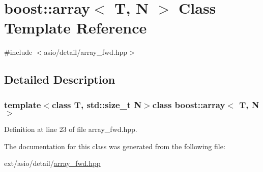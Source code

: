 \hypertarget{classboost_1_1array}{}\section{boost\+:\+:array$<$ T, N $>$ Class Template Reference}
\label{classboost_1_1array}


{\ttfamily \#include $<$asio/detail/array\+\_\+fwd.\+hpp$>$}



\subsection{Detailed Description}
\subsubsection*{template$<$class T, std\+::size\+\_\+t N$>$class boost\+::array$<$ T, N $>$}



Definition at line 23 of file array\+\_\+fwd.\+hpp.



The documentation for this class was generated from the following file\+:\begin{DoxyCompactItemize}
\item 
ext/asio/detail/\hyperlink{array__fwd_8hpp}{array\+\_\+fwd.\+hpp}\end{DoxyCompactItemize}

